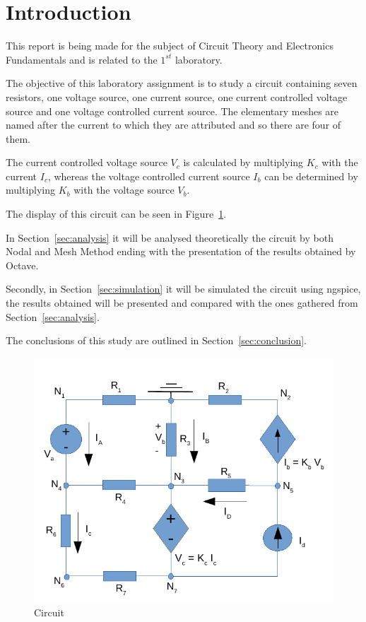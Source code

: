 \section{Introduction}
\label{sec:introduction}


\hspace{0,5cm} This report is being made for the subject of Circuit Theory and Electronics Fundamentals and is related to the $1^{st}$ laboratory.

The objective of this laboratory assignment is to study a circuit containing seven resistors, one voltage source, one current source, one current controlled voltage source and one voltage controlled current source. The elementary meshes are named after the current to which they are attributed and so there are four of them.

The current controlled voltage source $V_c$ is calculated by multiplying $K_c$ with the current $I_c$, whereas the voltage controlled current source $I_b$ can be determined by multiplying $K_b$ with the voltage source $V_b$.

The display of this circuit can be seen in Figure~\ref{fig:circuito}.

In Section~\ref{sec:analysis} it will be analysed theoretically the circuit by both Nodal and Mesh Method ending with the presentation of the results obtained by Octave.

Secondly, in Section~\ref{sec:simulation} it will be simulated the circuit using ngspice, the results obtained will be presented and compared with the ones gathered from Section~\ref{sec:analysis}.

The conclusions of this study are outlined in Section~\ref{sec:conclusion}.

\begin{figure}[h] \centering
\includegraphics[width=0.7\linewidth]{circuito.pdf}
\caption{Circuit} %
\label{fig:circuito}
\end{figure}


